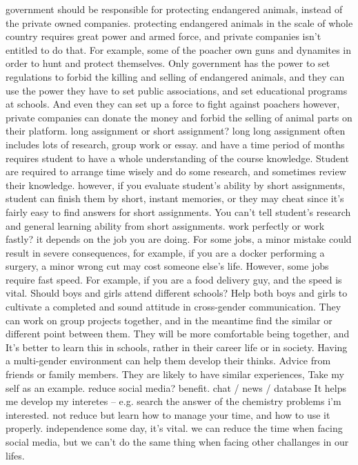 \documentclass{ctexart}
\begin{document}
\begin{outline}
    \1 government should be responsible for protecting endangered animals, instead of the private owned companies.
        \2 protecting endangered animals in the scale of whole country requires great power and armed force, and private companies isn't entitled to do that.
            \3 For example, some of the poacher own guns and dynamites in order to hunt and protect themselves. Only government has the power to set regulations to forbid the killing and selling of endangered animals, and they can use the power they have to set  public associations, and set educational programs at schools. And even they can set up a force to fight against poachers
            \3 however, private companies can donate the money and forbid the selling of animal parts on their platform.
    \1 long assignment or short assignment?
        \2 long
        \2 long assignment often includes lots of research, group work or essay. and have a time period of months requires student to have a whole understanding of the course knowledge. Student are required to arrange time wisely and do some research, and sometimes review their knowledge.
        \2 however, if you evaluate student's ability by short assignments, student can finish them by short, instant memories, or they may cheat since it's fairly easy to find answers for short assignments. You can't tell student's research and general learning ability from short assignments.
    \1 work perfectly or work fastly?
        \2 it depends on the job you are doing. For some jobs, a minor mistake could result in severe consequences, for example, if you are a docker performing a surgery, a minor wrong cut may cost someone else's life.
        \2 However, some jobs require fast speed. For example, if you are a food delivery guy, and the speed is vital.
    \1 Should boys and girls attend different schools?
        \2 Help both boys and girls to cultivate a completed and sound attitude in cross-gender communication. They can work on group projects together, and in the meantime find the similar or different point between them. They will be more comfortable being together, and It's better to learn this in schools, rather in their career life or in society.
        \2 Having a multi-gender environment can help them develop their thinks. 
    \1 Advice from friends or family members.
        \2 They are likely to have similar experiences, 
        \2 Take my self as an example.
    \1 reduce social media?
        \2 benefit. chat / news / database It helps me develop my interetes -- e.g. search the answer of the chemistry problems i'm interested. 
        \2 not reduce but learn how to manage your time, and how to use it properly.
            \3 independence some day, it's vital.
            \3 we can reduce the time when facing social media, but we can't do the same thing when facing other challanges in our lifes.
\end{outline}
\end{document}
